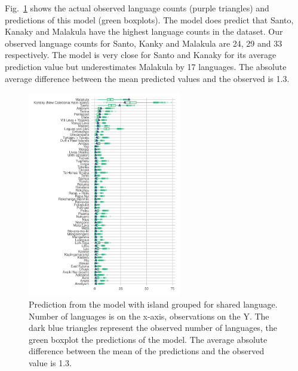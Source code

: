 \documentclass[unnumsec,webpdf,modern,medium]{oup-authoring-template}
\begin{document}
Fig.~\ref{medium_model_predict} shows the actual observed language counts (purple triangles) and predictions of this model (green boxplots). The model does predict that Santo, Kanaky and Malakula have the highest language counts in the dataset. Our observed language counts for Santo, Kanky and Malakula are 24, 29 and 33 respectively. The model is very close for Santo and Kanaky for its average prediction value but underestimates Malakula by 17 languages. The absolute average difference between the mean predicted values and the observed is 1.3.


\begin{figure}[ht]
\centering
\includegraphics[width=0.6\textwidth]{brms_predict_medium}
\caption{Prediction from the model with island grouped for shared language. Number of languages is on the x-axis, observations on the Y. The dark blue triangles represent the observed number of languages, the green boxplot the predictions of the model. The average absolute difference between the mean of the predictions and the observed value is 1.3.}
\label{medium_model_predict}
\end{figure}
\end{document}
